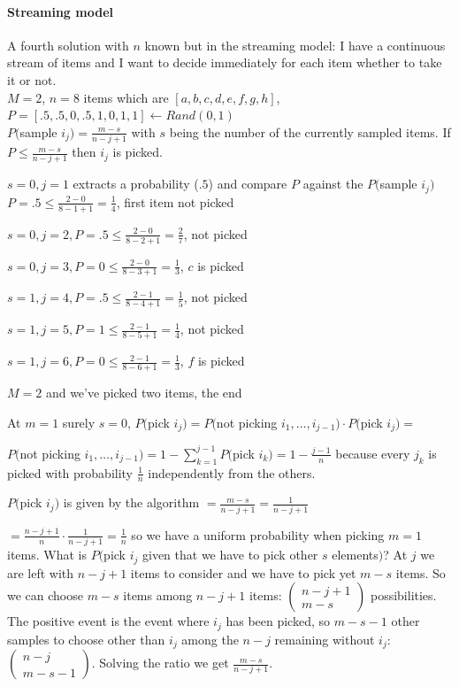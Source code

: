\documentclass[10pt]{report}
\begin{document}
\paragraph{Streaming model}
A fourth solution with $n$ known but in the streaming model: I have a continuous stream of items and I want to decide immediately for each item whether to take it or not.\\$M = 2$, $n = 8$ items which are $[a, b, c, d, e, f, g, h]$,\\$P = [.5, .5, 0, .5, 1, 0, 1, 1] \leftarrow Rand(0,1)$\\
$P($sample $i_j) = \frac{m - s}{n - j + 1}$ with $s$ being the number of the currently sampled items. If $P \leq \frac{m - s}{n - j + 1}$ then $i_j$ is picked.
\begin{list}{}{}
	\item $s = 0, j = 1$ extracts a probability ($.5$) and compare $P$ against the $P($sample $i_j)$\\
	$P = .5 \leq \frac{2 - 0}{8 - 1 + 1} = \frac{1}{4}$, first item not picked
	\item $s = 0, j = 2, P = .5 \leq \frac{2 - 0}{8 - 2 + 1} = \frac{2}{7}$, not picked
	\item $s = 0, j = 3, P = 0 \leq \frac{2 - 0}{8 - 3 + 1} = \frac{1}{3}$, $c$ is picked
	\item $s = 1, j = 4, P = .5 \leq \frac{2 - 1}{8 - 4 + 1} = \frac{1}{5}$, not picked
	\item $s = 1, j = 5, P = 1 \leq \frac{2 - 1}{8 - 5 + 1} = \frac{1}{4}$, not picked
	\item $s = 1, j = 6, P = 0 \leq \frac{2 - 1}{8 - 6 + 1} = \frac{1}{3}$, $f$ is picked
	\item $M = 2$ and we've picked two items, the end
\end{list}
At $m=1$ surely $s=0$, $P($pick $i_j) = P($not picking $i_1,\ldots, i_{j-1})\cdot P($pick $i_j) = $\begin{list}{}{}
	\item $P($not picking $i_1,\ldots, i_{j-1}) = 1 - \sum_{k=1}^{j-1} P($pick $i_k) = 1- \frac{j-1}{n}$ because every $j_k$ is picked with probability $\frac{1}{n}$ independently from the others.
	\item $P($pick $i_j)$ is given by the algorithm $= \frac{m - s}{n - j + 1} = \frac{1}{n-j+1}$
\end{list}
$ = \frac{n-j+1}{n}\cdot\frac{1}{n-j+1} = \frac{1}{n}$ so we have a uniform probability when picking $m=1$ items.
What is $P($pick $i_j$ given that we have to pick other $s$ elements$)$? At $j$ we are left with $n-j+1$ items to consider and we have to pick yet $m-s$ items. So we can choose $m-s$ items among $n-j+1$ items: $\left(\begin{array}{c}
n-j+1\\m-s
\end{array}\right)$ possibilities. The positive event is the event where $i_j$ has been picked, so $m-s-1$ other samples to choose other than $i_j$ among the $n-j$ remaining without $i_j$: $\left(\begin{array}{c}
n-j\\m-s-1
\end{array}\right)$. Solving the ratio we get $\frac{m-s}{n-j+1}$.\pagebreak
\end{document}
